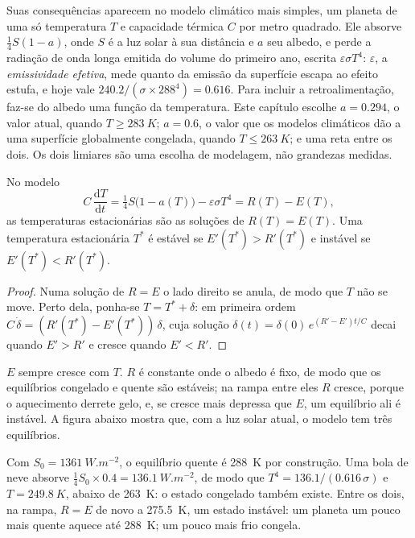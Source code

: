 Suas consequências aparecem no modelo climático mais simples, um planeta de uma só temperatura $T$ e
capacidade térmica $C$ por metro quadrado. Ele absorve $\tfrac14 S(1 - a)$, onde $S$ é a luz solar
à sua distância e $a$ seu albedo, e perde a radiação de onda longa emitida do volume do
primeiro ano, escrita $\varepsilon\sigma T^4$: $\varepsilon$, a \emph{emissividade efetiva},
mede quanto da emissão da superfície escapa ao efeito estufa, e hoje vale
$240.2/(\sigma\times288^4) = 0.616$. Para incluir a retroalimentação, faz-se do albedo uma função da
temperatura. Este capítulo escolhe $a = 0.294$, o valor atual, quando $T \ge \qty{283}{K}$; $a
= 0.6$, o valor que os modelos climáticos dão a uma superfície globalmente congelada, quando $T \le \qty{263}{K}$; e
uma reta entre os dois. Os dois limiares são uma escolha de modelagem, não grandezas
medidas.

\begin{proposition}\label{prop:b2:precambrian-earth:ebm}
No modelo
\[
  C\,\frac{\mathrm dT}{\mathrm dt} = \tfrac14 S\bigl(1 - a(T)\bigr) - \varepsilon\sigma T^4
  = R(T) - E(T),
\]
as temperaturas estacionárias são as soluções de $R(T) = E(T)$. Uma temperatura estacionária $T^*$ é
estável se $E'(T^*) > R'(T^*)$ e instável se $E'(T^*) < R'(T^*)$.
\end{proposition}

\begin{proof}
Numa solução de $R = E$ o lado direito se anula, de modo que $T$ não se move. Perto dela, ponha-se $T = T^*
+ \delta$: em primeira ordem $C\,\dot\delta = (R'(T^*) - E'(T^*))\,\delta$, cuja solução
$\delta(t) = \delta(0)\,e^{(R' - E')t/C}$ decai quando $E' > R'$ e cresce quando $E' < R'$.
\end{proof}

$E$ sempre cresce com $T$. $R$ é constante onde o albedo é fixo, de modo que os equilíbrios congelado e
quente são estáveis; na rampa entre eles $R$ cresce, porque o aquecimento derrete gelo, e, se
cresce mais depressa que $E$, um equilíbrio ali é instável. A figura abaixo mostra que, com a luz solar
atual, o modelo tem três equilíbrios.

\begin{example}\label{ex:b2:precambrian-earth:three}
Com $S_0 = \qty{1361}{W.m^{-2}}$, o equilíbrio quente é \qty{288}{K} por construção. Uma
bola de neve absorve $\tfrac14 S_0\times0.4 = \qty{136.1}{W.m^{-2}}$, de modo que $T^4 =
136.1/(0.616\,\sigma)$ e $T = \qty{249.8}{K}$, abaixo de \qty{263}{K}: o estado congelado também
existe. Entre os dois, na rampa, $R = E$ de novo a \qty{275.5}{K}, um estado instável: um
planeta um pouco mais quente aquece até \qty{288}{K}; um pouco mais frio congela.
\end{example}


